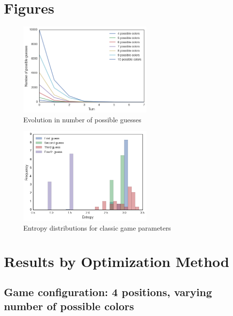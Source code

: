 \documentclass[11pt]{article}
\begin{document}
\newpage
\appendix

\section{Figures}

\begin{figure}[!htbp]
\centering
\includegraphics[width=0.6\textwidth]{img/num_guesses}
\caption{Evolution in number of possible guesses}
\label{fig:num_guesses}
\end{figure}

\begin{figure}[!htbp]
\centering
\includegraphics[width=0.6\textwidth]{img/entropy}
\caption{Entropy distributions for classic game parameters}
\label{fig:entropy}
\end{figure}

\newpage
\section{Results by Optimization Method}\label{graphical_results}

\subsection*{Game configuration: 4 positions, varying number of possible colors}
\end{document}
